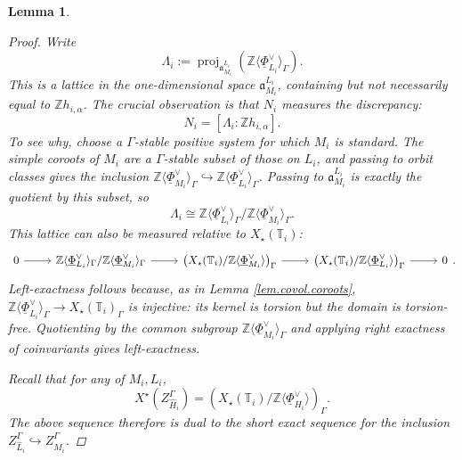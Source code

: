 \documentclass[openany]{amsbook}
\newtheorem{lemma}[theorem]{Lemma}
\theoremstyle{definition}
\theoremstyle{remark}
\numberwithin{equation}{section}
\newcommand{\Z}{\mathbb{Z}}
\newcommand{\T}{\mathbb{T}}
\newcommand{\ul}[1]{\underline{#1}}
\renewcommand{\-}{\operatorname{-}}
\renewcommand{\a}{\mathfrak{a}}
\newcommand{\on}[1]{\operatorname{#1}}
\begin{document}
\begin{lemma}
\begin{proof}
        Write $$\Lambda_i := \on{proj}_{\a_{M_i}^{L_i}} \left(\Z \langle \ul{\Phi}_{L_i}^\vee \rangle_\Gamma\right).$$ This is a lattice in the one-dimensional space $\a_{M_i}^{L_i}$, containing but not necessarily equal to $\Z h_{i, \alpha}$. The crucial observation is that $N_i$ measures the discrepancy:
        \begin{equation}
            N_i = [\Lambda_i : \Z h_{i, \alpha}].\label{eqn.Ni.const.nonstd.interp}
        \end{equation} 
        To see why, choose a $\Gamma$-stable positive system for which $M_i$ is standard. The simple coroots of $M_i$ are a $\Gamma$-stable subset of those on $L_i$, and passing to orbit classes gives the inclusion $\Z \langle \ul{\Phi}_{M_i}^\vee \rangle_\Gamma \hookrightarrow \Z \langle \ul{\Phi}_{L_i}^\vee \rangle_\Gamma$. Passing to $\a_{M_i}^{L_i}$ is exactly the quotient by this subset, so
        \begin{equation}
            \Lambda_i \cong \Z \langle \ul{\Phi}_{L_i}^\vee \rangle_\Gamma/\Z \langle \ul{\Phi}_{M_i}^\vee \rangle_\Gamma.\label{eqn.Lambdai.coker}
        \end{equation}
        This lattice can also be measured relative to $X_\star(\T_i)$:
        $$
            \begin{tikzcd}
                0 \ar[r] & \Z \langle \ul{\Phi}_{L_i}^\vee \rangle_\Gamma/ \Z \langle \ul{\Phi}_{M_i}^\vee \rangle_\Gamma \ar[r] & \left(X_\star(\T_i)/\Z \langle \ul{\Phi}_{M_i}^\vee \rangle\right)_\Gamma \ar[r] & \left(X_\star(\T_i)/\Z \langle \ul{\Phi}_{L_i}^\vee \rangle\right)_\Gamma \ar[r] & 0
            \end{tikzcd}.
        $$
        Left-exactness follows because, as in Lemma \ref{lem.covol.coroots}, $\Z \langle \ul{\Phi}_{L_i}^\vee \rangle_\Gamma \to X_\star(\T_i)_\Gamma$ is injective: its kernel is torsion but the domain is torsion-free. Quotienting by the common subgroup $\Z \langle \ul{\Phi}_{M_i}^\vee \rangle_\Gamma$ and applying right exactness of coinvariants gives left-exactness.

        Recall that for any of $M_i, L_i$,
        $$
            X^\star(Z_{\widehat{H}_i}^\Gamma) = \left(X_\star(\T_i)/\Z \langle \ul{\Phi}_{H_i}^\vee \rangle\right)_\Gamma.
        $$
        The above sequence therefore is dual to the short exact sequence for the inclusion $Z_{\widehat{L}_i}^\Gamma \hookrightarrow Z_{\widehat{M}_i}^\Gamma$. 
        

\end{proof}
\end{lemma}
\end{document}
